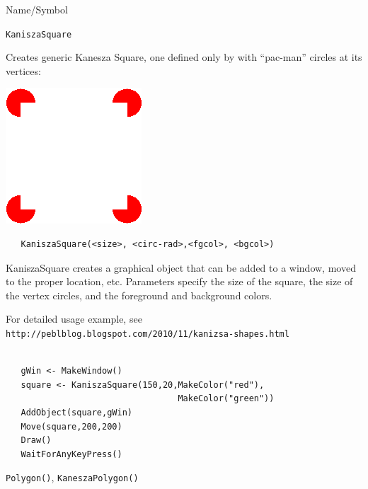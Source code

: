 \begin{desc}{Name/Symbol}
\item[Name/Symbol]	\verb+KaniszaSquare+

\item[Description]	Creates generic Kanesza Square, one defined only by with ``pac-man'' circles at its vertices:  

\includegraphics[scale=.5]{images/kaniszasquare.png} 
 

\item[Usage]	
\begin{verbatim}
   KaniszaSquare(<size>, <circ-rad>,<fgcol>, <bgcol>)
\end{verbatim}
KaniszaSquare creates a graphical object that can be added to a window, moved to the proper location, etc.  Parameters specify the size of the square, the size of the vertex circles, and the foreground and background colors.

\item[Example]	
For detailed usage example, see
\verb+http://peblblog.blogspot.com/2010/11/kanizsa-shapes.html+
	
\begin{verbatim}

   gWin <- MakeWindow()
   square <- KaniszaSquare(150,20,MakeColor("red"),
                                  MakeColor("green"))
   AddObject(square,gWin)
   Move(square,200,200)
   Draw()
   WaitForAnyKeyPress()

\end{verbatim}
  


\item[See Also] \verb+Polygon()+, \verb+KaneszaPolygon()+
\end{desc}

\vfill
\newpage
{}
\vfill


